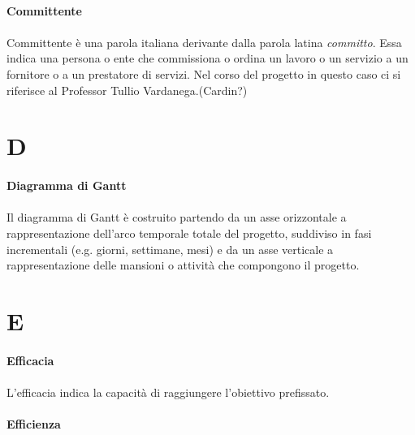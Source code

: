 \documentclass[10pt, a4paper]{article}
\begin{document}
\vspace{2em}
\paragraph{Committente}\noindent\hrulefill
\paragraph{}Committente è una parola italiana derivante dalla parola latina \textit{committo}. Essa indica una persona o ente che commissiona o ordina un lavoro o un servizio a un fornitore o a un prestatore di
servizi. Nel corso del progetto in questo caso ci si riferisce al Professor Tullio Vardanega.(Cardin?)

\newpage
\section{D}

\vspace{2em}
\paragraph{Diagramma di Gantt}\noindent\hrulefill
\paragraph{}Il diagramma di Gantt è costruito partendo da un asse orizzontale a rappresentazione dell’arco temporale
totale del progetto, suddiviso in fasi incrementali (e.g. giorni, settimane, mesi) e da un asse
verticale a rappresentazione delle mansioni o attività che compongono il progetto.


\newpage
\section{E}
\vspace{2em}
\paragraph{Efficacia}\noindent\hrulefill
\paragraph{}L'efficacia indica la capacità di raggiungere l'obiettivo prefissato.

\vspace{2em}
\paragraph{Efficienza}\noindent\hrulefill
\end{document}
